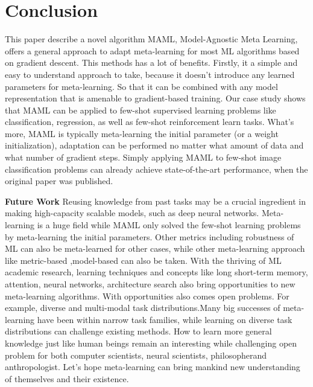 \section{Conclusion}

This paper describe a novel algorithm MAML, Model-Agnostic Meta Learning, offers a general approach to adapt meta-learning for most ML algorithms based on gradient descent. 
This methods has a lot of benefits. Firstly, it a simple and easy to understand approach to take, because it doesn't introduce any learned parameters for meta-learning. So that it can be combined with any model representation that is amenable to gradient-based training. Our case study shows that MAML can be applied to few-shot supervised learning problems like classification, regression, as well as few-shot reinforcement learn tasks. What's more, MAML is typically meta-learning the initial parameter (or a weight initialization), adaptation can be performed no matter what amount of data and what number of gradient steps. Simply applying MAML to few-shot image classification problems can already achieve state-of-the-art performance, when the original paper was published. 

\textbf{Future Work} 
Reusing knowledge from past tasks may be a crucial ingredient in making high-capacity scalable models, such as deep neural networks. 
Meta-learning is a huge field while MAML only solved the few-shot learning problems by meta-learning the initial parameters. Other metrics including robustness\cite{Lee2021MachineLR,Simester2020TargetingPC,HancoxLi2020RobustnessIM,Sehwag2019AnalyzingTR,Chandrasekaran2019LG} of ML can also be meta-learned for other cases, while other meta-learning approach like metric-based \cite{Chen2020VariationalMS, Wang2021MetricbasedMM,Wang2020FewShotRB},model-based\cite{Belkhale2020ModelBasedMF,Xu2020FastTA,CoReyes2021ACCELERATINGOR } can also be taken. With the thriving of ML academic research, learning techniques and concepts like long short-term memory\cite{Sak2014LongSM}, attention\cite{Martin2019InterpretableML}, neural networks\cite{Schmidhuber2015DeepLI,Abadi2016TensorFlowAS}, architecture search\cite{Jafra2018ARO} also bring opportunities to new meta-learning algorithms.
With opportunities also comes open problems. For example, diverse and multi-modal task distributions.Many big successes of meta-learning have been within narrow task families, while learning on diverse task distributions can challenge existing methods. How to learn more general knowledge just like human beings remain an interesting while challenging open problem for both computer scientists, neural scientists\cite{Horton1984HumanLA,Lindsay2020AttentionIP}, philosopher\cite{Cowan2012MemoryAH}and anthropologist. Let's hope meta-learning can bring mankind new understanding of themselves and their existence.


